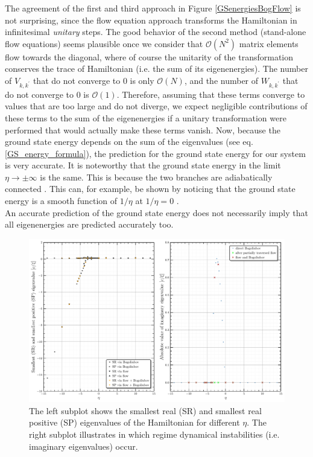 The agreement of the first and third approach in Figure \ref{GSenergiesBogFlow} is not surprising, since the flow equation approach transforms the Hamiltonian in infinitesimal \emph{unitary} steps. The good behavior of the second method (stand-alone flow equations) seems plausible once we consider that $\mathcal O(N^2)$ matrix elements flow towards the diagonal, where of course the unitarity of the transformation conserves the trace of Hamiltonian (i.e. the sum of its eigenenergies). The number of $V_{k,k^\prime}$ that do not converge to 0 is only $\mathcal O(N)$, and the number of $W_{k,k^\prime}$ that do not converge to 0 is $\mathcal O(1)$. Therefore, assuming that these terms converge to values that are too large and do not diverge, we expect negligible contributions of these terms to the sum of the eigenenergies if a unitary transformation were performed that would actually make these terms vanish. Now, because the ground state energy depends on the sum of the eigenvalues (see eq. \ref{GS_energy_formula}), the prediction for the ground state energy for our system is very accurate. It is noteworthy that the ground state energy in the limit $\eta\rightarrow\pm\infty$ is the same. This is because the two branches are adiabatically connected \cite{Grusdt_2017,PhysRevA.98.033610}. This can, for example, be shown by noticing that the ground state energy is a smooth function of $1/\eta$ at $1/\eta=0$ \cite[Fig. 1]{PhysRevA.98.033610}.\\
An accurate prediction of the ground state energy does not necessarily imply that all eigenenergies are predicted accurately too. 
\begin{figure}[H]
    \centering
    \includegraphics[width=\textwidth]{figures/plots/PDF/spectrum_analysis_bog_flow_comp.pdf}
    \caption[Characteristic eigenenergies of the Bose Polaron for different $\eta$]{The left subplot shows the smallest real (SR) and smallest real positive (SP) eigenvalues of the Hamiltonian for different $\eta$. The right subplot illustrates in which regime dynamical instabilities (i.e. imaginary eigenvalues) occur.
}
    \label{SpectrumAnalysis}
\end{figure}
